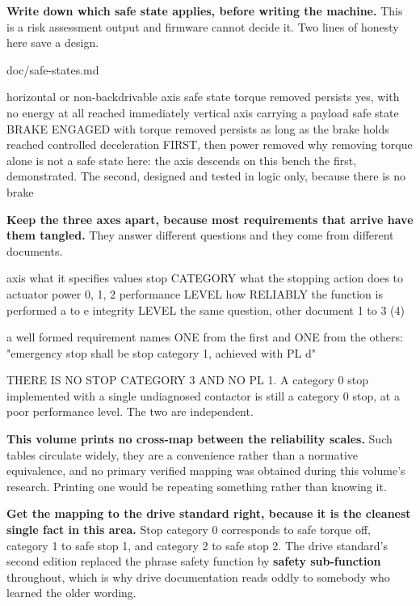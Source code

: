 \begin{steps}
\item \textbf{Write down which safe state applies, before writing the machine.}
This is a risk assessment output and firmware cannot decide it. Two lines of
honesty here save a design.
\begin{plaincode}
doc/safe-states.md

  horizontal or non-backdrivable axis
      safe state      torque removed
      persists        yes, with no energy at all
      reached         immediately
  vertical axis carrying a payload
      safe state      BRAKE ENGAGED with torque removed
      persists        as long as the brake holds
      reached         controlled deceleration FIRST, then power removed
      why             removing torque alone is not a safe state here: the
                      axis descends
  on this bench       the first, demonstrated. The second, designed and
                      tested in logic only, because there is no brake
\end{plaincode}

\item \textbf{Keep the three axes apart, because most requirements that arrive
have them tangled.} They answer different questions and they come from different
documents.
\begin{plaincode}
axis                what it specifies                        values
stop CATEGORY       what the stopping action does to
                    actuator power                           0, 1, 2
performance LEVEL   how RELIABLY the function is performed   a to e
integrity LEVEL     the same question, other document        1 to 3 (4)

a well formed requirement names ONE from the first and ONE from the others:
  "emergency stop shall be stop category 1, achieved with PL d"

THERE IS NO STOP CATEGORY 3 AND NO PL 1.
A category 0 stop implemented with a single undiagnosed contactor is still
a category 0 stop, at a poor performance level. The two are independent.
\end{plaincode}
\textbf{This volume prints no cross-map between the reliability scales.} Such
tables circulate widely, they are a convenience rather than a normative
equivalence, and no primary verified mapping was obtained during this volume's
research. Printing one would be repeating something rather than knowing it.

\item \textbf{Get the mapping to the drive standard right, because it is the
cleanest single fact in this area.} Stop category 0 corresponds to safe torque
off, category 1 to safe stop 1, and category 2 to safe stop 2. The drive
standard's second edition replaced the phrase safety function by \textbf{safety
sub-function} throughout, which is why drive documentation reads oddly to
somebody who learned the older wording.


\end{steps}
